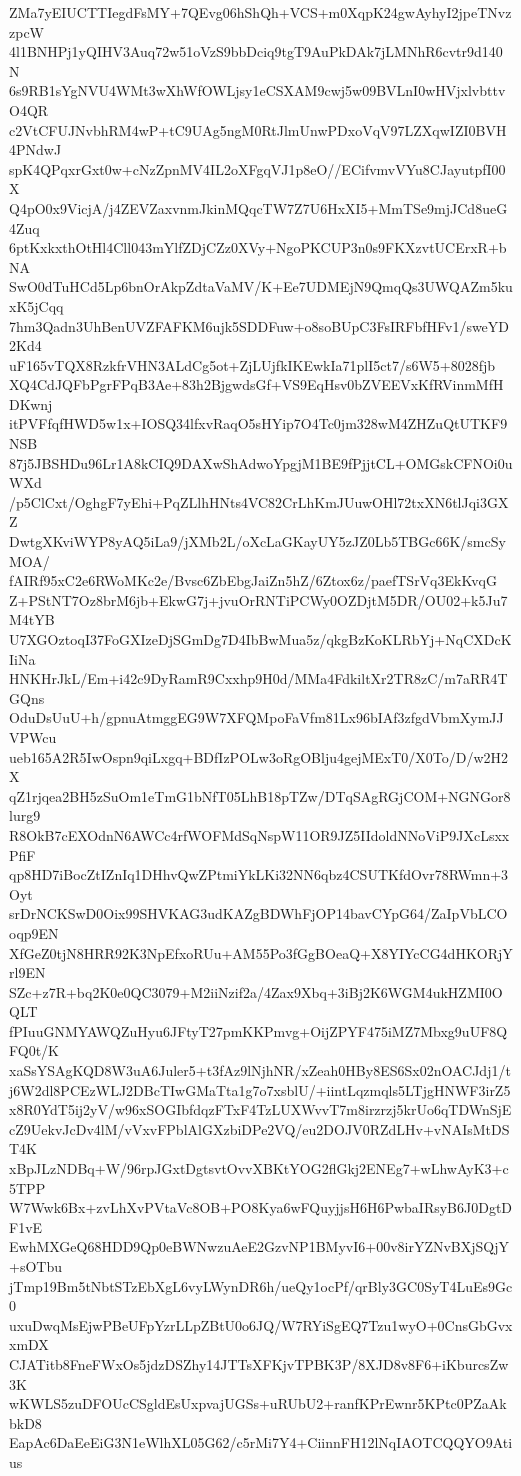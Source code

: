 ZMa7yEIUCTTIegdFsMY+7QEvg06hShQh+VCS+m0XqpK24gwAyhyI2jpeTNvzzpcW
4l1BNHPj1yQIHV3Auq72w51oVzS9bbDciq9tgT9AuPkDAk7jLMNhR6cvtr9d140N
6s9RB1sYgNVU4WMt3wXhWfOWLjsy1eCSXAM9cwj5w09BVLnI0wHVjxlvbttvO4QR
c2VtCFUJNvbhRM4wP+tC9UAg5ngM0RtJlmUnwPDxoVqV97LZXqwIZI0BVH4PNdwJ
spK4QPqxrGxt0w+cNzZpnMV4IL2oXFgqVJ1p8eO//ECifvmvVYu8CJayutpfI00X
Q4pO0x9VicjA/j4ZEVZaxvnmJkinMQqcTW7Z7U6HxXI5+MmTSe9mjJCd8ueG4Zuq
6ptKxkxthOtHl4Cll043mYlfZDjCZz0XVy+NgoPKCUP3n0s9FKXzvtUCErxR+bNA
SwO0dTuHCd5Lp6bnOrAkpZdtaVaMV/K+Ee7UDMEjN9QmqQs3UWQAZm5kuxK5jCqq
7hm3Qadn3UhBenUVZFAFKM6ujk5SDDFuw+o8soBUpC3FsIRFbfHFv1/sweYD2Kd4
uF165vTQX8RzkfrVHN3ALdCg5ot+ZjLUjfkIKEwkIa71plI5ct7/s6W5+8028fjb
XQ4CdJQFbPgrFPqB3Ae+83h2BjgwdsGf+VS9EqHsv0bZVEEVxKfRVinmMfHDKwnj
itPVFfqfHWD5w1x+IOSQ34lfxvRaqO5sHYip7O4Tc0jm328wM4ZHZuQtUTKF9NSB
87j5JBSHDu96Lr1A8kCIQ9DAXwShAdwoYpgjM1BE9fPjjtCL+OMGskCFNOi0uWXd
/p5ClCxt/OghgF7yEhi+PqZLlhHNts4VC82CrLhKmJUuwOHl72txXN6tlJqi3GXZ
DwtgXKviWYP8yAQ5iLa9/jXMb2L/oXcLaGKayUY5zJZ0Lb5TBGc66K/smcSyMOA/
fAIRf95xC2e6RWoMKc2e/Bvsc6ZbEbgJaiZn5hZ/6Ztox6z/paefTSrVq3EkKvqG
Z+PStNT7Oz8brM6jb+EkwG7j+jvuOrRNTiPCWy0OZDjtM5DR/OU02+k5Ju7M4tYB
U7XGOztoqI37FoGXIzeDjSGmDg7D4IbBwMua5z/qkgBzKoKLRbYj+NqCXDcKIiNa
HNKHrJkL/Em+i42c9DyRamR9Cxxhp9H0d/MMa4FdkiltXr2TR8zC/m7aRR4TGQns
OduDsUuU+h/gpnuAtmggEG9W7XFQMpoFaVfm81Lx96bIAf3zfgdVbmXymJJVPWcu
ueb165A2R5IwOspn9qiLxgq+BDfIzPOLw3oRgOBlju4gejMExT0/X0To/D/w2H2X
qZ1rjqea2BH5zSuOm1eTmG1bNfT05LhB18pTZw/DTqSAgRGjCOM+NGNGor8lurg9
R8OkB7cEXOdnN6AWCc4rfWOFMdSqNspW11OR9JZ5IIdoldNNoViP9JXcLsxxPfiF
qp8HD7iBocZtIZnIq1DHhvQwZPtmiYkLKi32NN6qbz4CSUTKfdOvr78RWmn+3Oyt
srDrNCKSwD0Oix99SHVKAG3udKAZgBDWhFjOP14bavCYpG64/ZaIpVbLCOoqp9EN
XfGeZ0tjN8HRR92K3NpEfxoRUu+AM55Po3fGgBOeaQ+X8YIYcCG4dHKORjYrl9EN
SZc+z7R+bq2K0e0QC3079+M2iiNzif2a/4Zax9Xbq+3iBj2K6WGM4ukHZMI0OQLT
fPIuuGNMYAWQZuHyu6JFtyT27pmKKPmvg+OijZPYF475iMZ7Mbxg9uUF8QFQ0t/K
xaSsYSAgKQD8W3uA6Juler5+t3fAz9lNjhNR/xZeah0HBy8ES6Sx02nOACJdj1/t
j6W2dl8PCEzWLJ2DBcTIwGMaTta1g7o7xsblU/+iintLqzmqls5LTjgHNWF3irZ5
x8R0YdT5ij2yV/w96xSOGIbfdqzFTxF4TzLUXWvvT7m8irzrzj5krUo6qTDWnSjE
cZ9UekvJcDv4lM/vVxvFPblAlGXzbiDPe2VQ/eu2DOJV0RZdLHv+vNAIsMtDST4K
xBpJLzNDBq+W/96rpJGxtDgtsvtOvvXBKtYOG2flGkj2ENEg7+wLhwAyK3+c5TPP
W7Wwk6Bx+zvLhXvPVtaVc8OB+PO8Kya6wFQuyjjsH6H6PwbaIRsyB6J0DgtDF1vE
EwhMXGeQ68HDD9Qp0eBWNwzuAeE2GzvNP1BMyvI6+00v8irYZNvBXjSQjY+sOTbu
jTmp19Bm5tNbtSTzEbXgL6vyLWynDR6h/ueQy1ocPf/qrBly3GC0SyT4LuEs9Gc0
uxuDwqMsEjwPBeUFpYzrLLpZBtU0o6JQ/W7RYiSgEQ7Tzu1wyO+0CnsGbGvxxmDX
CJATitb8FneFWxOs5jdzDSZhy14JTTsXFKjvTPBK3P/8XJD8v8F6+iKburcsZw3K
wKWLS5zuDFOUcCSgldEsUxpvajUGSs+uRUbU2+ranfKPrEwnr5KPtc0PZaAkbkD8
EapAc6DaEeEiG3N1eWlhXL05G62/c5rMi7Y4+CiinnFH12lNqIAOTCQQYO9Atius
